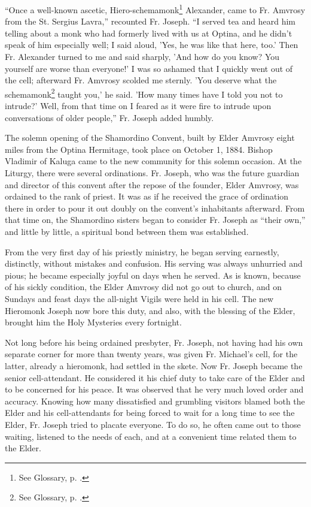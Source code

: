 ``Once a well-known ascetic, Hiero-schemamonk\footnote{See Glossary, p. \pageref{hiero-schemamonk}.} Alexander, came to Fr. Amvrosy from the St. Sergius Lavra,'' recounted Fr. Joseph. ``I served tea and heard him telling about a monk who had formerly lived with us at Optina, and he didn't speak of him especially well; I said aloud, 'Yes, he was like that here, too.' Then Fr. Alexander turned to me and said sharply, 'And how do you know? You yourself are worse than everyone!' I was so ashamed that I quickly went out of the cell; afterward Fr. Amvrosy scolded me sternly. 'You deserve what the schemamonk\footnote{See Glossary, p. \pageref{schemamonk}.} taught you,' he said. 'How many times have I told you not to intrude?' Well, from that time on I feared as it were fire to intrude upon conversations of older people,'' Fr. Joseph added humbly.

The solemn opening of the Shamordino Convent, built by Elder Amvrosy eight miles from the Optina Hermitage, took place on October 1, 1884. Bishop Vladimir of Kaluga came to the new community for this solemn occasion. At the Liturgy, there were several ordinations. Fr. Joseph, who was the future guardian and director of this convent after the repose of the founder, Elder Amvrosy, was ordained to the rank of priest. It was as if he received the grace of ordination there in order to pour it out doubly on the convent's inhabitants afterward. From that time on, the Shamordino sisters began to consider Fr. Joseph as ``their own,'' and little by little, a spiritual bond between them was established.

From the very first day of his priestly ministry, he began serving earnestly, distinctly, without mistakes and confusion. His serving was always unhurried and pious; he became especially joyful on days when he served. As is known, because of his sickly condition, the Elder Amvrosy did not go out to church, and on Sundays and feast days the all-night Vigils were held in his cell. The new Hieromonk Joseph now bore this duty, and also, with the blessing of the Elder, brought him the Holy Mysteries every fortnight.

Not long before his being ordained presbyter, Fr. Joseph, not having had his own separate corner for more than twenty years, was given Fr. Michael's cell, for the latter, already a hieromonk, had settled in the skete. Now Fr. Joseph became the senior cell-attendant. He considered it his chief duty to take care of the Elder and to be concerned for his peace. It was observed that he very much loved order and accuracy. Knowing how many dissatisfied and grumbling visitors blamed both the Elder and his cell-attendants for being forced to wait for a long time to see the Elder, Fr. Joseph tried to placate everyone. To do so, he often came out to those waiting, listened to the needs of each, and at a convenient time related them to the Elder.

